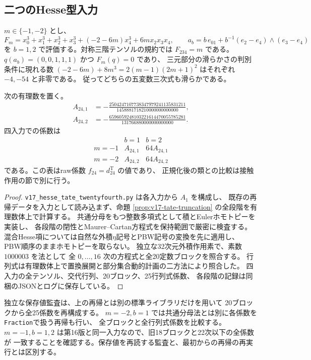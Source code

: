 \subsection{二つのHesse型入力}
$m\in\{-1,-2\}$ とし、
\[
 F_m=x_0^3+x_1^3+x_2^3+x_3^3+(-2-6m)x_4^3+6m x_2x_3x_4,
 \qquad
 a_b=b\,e_{01}+b^{-1}(e_2-e_4)\wedge(e_3-e_4)
\]
を $b=1,2$ で評価する。対称三階テンソルの規約では $F_{234}=m$ である。
$q(a_b)=(0,0,1,1,1)$ かつ $F_m(q)=0$ であり、
三元部分の滑らかさの判別条件に現れる数
$(-2-6m)+8m^3=2(m-1)(2m+1)^2$ はそれぞれ $-4,-54$ と非零である。
従ってどちらの五変数三次式も滑らかである。

\begin{proposition}[四入力のraw二十四次係数]\label{prop:v17-tate24-values}
次の有理数を置く。
\begin{align*}
 A_{24,1}&=-\frac{2504247107738347979241135831211}
                      {1458881718210000000000000},\\
 A_{24,2}&=-\frac{6596059248103221614470055785281}
                      {131766880000000000000}.
\end{align*}
四入力での係数は
\[
 \begin{array}{c|cc}
       &b=1&b=2\\\hline
  m=-1&A_{24,1}&64A_{24,1}\\
  m=-2&A_{24,2}&64A_{24,2}
 \end{array}
\]
である。この表はraw係数 $f_{24}=d^{\mathrm T}_{24}$ の値であり、
正規化後の類との比較は接触作用の節で別に行う。
\end{proposition}
\begin{proof}
\texttt{v17\_hesse\_tate\_twentyfourth.py} は各入力から $A_1$ を構成し、
既存の再帰データを入力として読み込まず、命題
\ref{prop:v17-tate-truncation} の全段階を有理数体上で計算する。
共通分母をもつ整数多項式として積とEulerホモトピーを実装し、
各段階の閉性とMaurer--Cartan方程式を保持範囲で厳密に検査する。
混合Hesse項については自然な外積$\eta$記号とPBW記号の変換を先に適用し、
PBW順序のままホモトピーを取らない。
独立な32次元外積作用素で、素数 $1000003$ を法として
全 $0,\ldots,16$ 次の方程式と全20定数ブロックを照合する。
行列式は有理数体上で置換展開と部分集合動的計画の二方法により照合した。
四入力の全テンソル、交代行列、20ブロック、25行列式係数、
各段階の記録は同梱のJSONとログに保存している。
\end{proof}

独立な保存値監査は、上の再帰とは別の標準ライブラリだけを用いて
20ブロックから全25係数を再構成する。
$m=-2,b=1$ では共通分母法とは別に各係数を\texttt{Fraction}で扱う再帰も行い、
全ブロックと全行列式係数を比較する。
$m=-1,b=1,2$ は第16版と同一入力なので、旧18ブロックと22次以下の全係数が
一致することを確認する。保存値を再読する監査と、最初からの再帰の再実行とは区別する。


